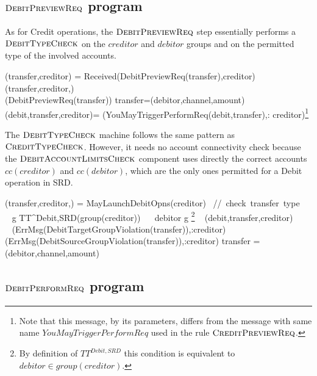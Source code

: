 \subsection{$\hbox{\sc DebitPreviewReq}$ program}
\label{sect:debitpreview}

As for Credit operations, the $\hbox{\sc DebitPreviewReq}$ step essentially performs a $\hbox{\sc DebitTypeCheck}$ on the $creditor$ and $debitor$ groups and on the permitted type of the involved accounts. 

\begin{asm}
(transfer,creditor)  =\+
  \IF Received(DebitPreviewReq(transfer),\FROM creditor) \THEN \+   
      (transfer,creditor,)\\
      (DebitPreviewReq(transfer)) \-
\WHERE \+
transfer=(debitor,channel,amount)\\
(debit,transfer,creditor)=\+
(YouMayTriggerPerformReq(debit,transfer),\TO : creditor)\footnote{Note that this message,  by its parameters, differs from the message with same name $YouMayTriggerPerformReq$ used in the rule $\hbox{\sc CreditPreviewReq}$.}
\end{asm}

The $\hbox{\sc DebitTypeCheck}$ machine follows the same pattern as $\hbox{\sc CreditTypeCheck}$. However, it needs no account connectivity check because the $\hbox{\sc DebitAccountLimitsCheck}$ component uses directly the correct accounts  $cc(creditor)$ and $cc(debitor)$, which are the only ones permitted for a Debit operation in SRD.


\begin{asm}
(transfer,creditor,)  =\+
\IF MayLaunchDebitOpns(creditor) \mbox{  // check transfer type}\+
  \THEN ~ \IF  ~ \FORSOME g \in TT^{Debit,SRD}(group(creditor)) 
          ~~ debitor \in g \footnote{By definition of $TT^{Debit,SRD}$ this condition is equivalent to $debitor \in group(creditor)$.} \+
       \THEN  ~ (debit,transfer,creditor) \\
        \ELSE ~ 
        (ErrMsg(DebitTargetGroupViolation(transfer)),\TO :creditor) \- 
  \ELSE ~ 
  (ErrMsg(DebitSourceGroupViolation(transfer)),\TO :creditor)\-
 \WHERE \+
   transfer = (debitor,channel,amount) 
\end{asm}



\subsection{$\hbox{\sc DebitPerformReq}$ program}
\label{sect:debitperform}

